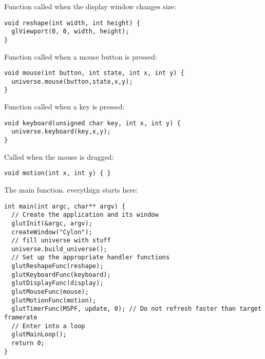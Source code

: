 \noindent
Function called when the display window changes size: \begin{lstlisting}
void reshape(int width, int height) {
  glViewport(0, 0, width, height);
}
\end{lstlisting}
\noindent
Function called when a mouse button is pressed: \begin{lstlisting}
void mouse(int button, int state, int x, int y) { 
  universe.mouse(button,state,x,y);
}
\end{lstlisting}
\noindent
Function called when a key is pressed: \begin{lstlisting}
void keyboard(unsigned char key, int x, int y) {
  universe.keyboard(key,x,y);
}
\end{lstlisting}
\noindent
Called when the mouse is dragged: \begin{lstlisting}
void motion(int x, int y) { }
\end{lstlisting}
\noindent
The main function. everythign starts here: \begin{lstlisting}
int main(int argc, char** argv) {
  // Create the application and its window
  glutInit(&argc, argv);
  createWindow("Cylon");
  // fill universe with stuff
  universe.build_universe();
  // Set up the appropriate handler functions
  glutReshapeFunc(reshape);
  glutKeyboardFunc(keyboard);
  glutDisplayFunc(display);
  glutMouseFunc(mouse);
  glutMotionFunc(motion);
  glutTimerFunc(MSPF, update, 0); // Do not refresh faster than target framerate
  // Enter into a loop
  glutMainLoop();
  return 0;
}
\end{lstlisting}
